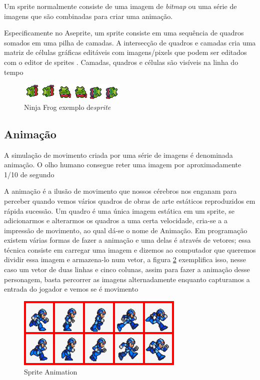 Um sprite normalmente consiste de uma imagem de \textit{bitmap} ou uma série de imagens que são combinadas para criar uma animação.

Especificamente no Aseprite, um sprite consiste em uma sequência de quadros somados em uma pilha de camadas. A intersecção de quadros e camadas cria uma matriz de células gráficas editáveis com imagens/pixels que podem ser editados com o editor de sprites . Camadas, quadros e células são visíveis na linha do tempo
\begin{figure}[h!]
    \centering
    \includegraphics[width=1\linewidth]{figuras/sprite-frog.png}
    \caption{Ninja Frog exemplo de\textit{sprite}}
    \label{fig:sprite-frog}
\end{figure}


\subsection{Animação}
\label{sec:animacao}
A simulação de movimento criada por uma série de imagens é denominada animação. O olho humano  consegue reter uma imagem por aproximadamente 1/10 de segundo

 A animação é a ilusão de movimento que nossos cérebros nos enganam para perceber quando vemos vários quadros de obras de arte estáticos reproduzidos em rápida sucessão.
Um quadro é uma única imagem estática em um sprite, se adicionarmos e alterarmos os quadros a uma certa velocidade, cria-se a a impressão de movimento, ao qual dá-se o nome de Animação. 
Em programação existem várias formas de fazer a animação e uma delas é através de vetores; essa técnica consiste em carregar uma imagem e dizemos ao computador que queremos dividir essa imagem e armazena-lo num vetor, a figura \ref{fig:sprite-animation} exemplifica isso, nesse caso um vetor de duas linhas e cinco colunas, assim para fazer a animação desse personagem, basta percorrer as imagens alternadamente enquanto capturamos a entrada do jogador e vemos se é movimento

\begin{figure}[h!]
    \centering
    \includegraphics[width=0.8\linewidth]{figuras/megaman-sprite-animation-export.png}
    \caption{Sprite Animation}
    \label{fig:sprite-animation}
\end{figure}






